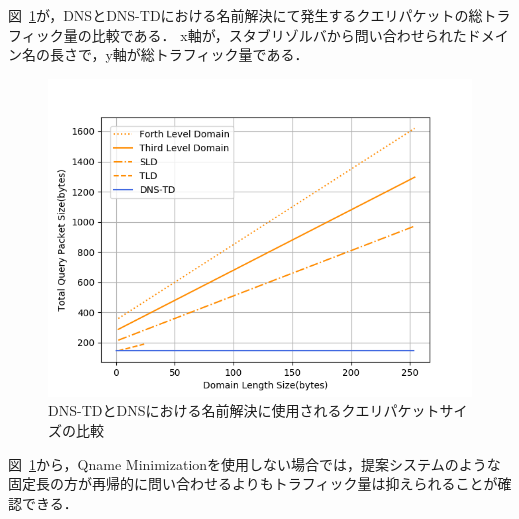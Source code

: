 図~\ref{fig:length-size}が，DNSとDNS-TDにおける名前解決にて発生するクエリパケットの総トラフィック量の比較である．
x軸が，スタブリゾルバから問い合わせられたドメイン名の長さで，y軸が総トラフィック量である．

\begin{figure}[p]
 \centering
 \includegraphics[scale=0.8]{figure/length-size.png}
 \caption{DNS-TDとDNSにおける名前解決に使用されるクエリパケットサイズの比較}
 \label{fig:length-size}
\end{figure}


図~\ref{fig:length-size}から，Qname Minimizationを使用しない場合では，提案システムのような固定長の方が再帰的に問い合わせるよりもトラフィック量は抑えられることが確認できる．

%


